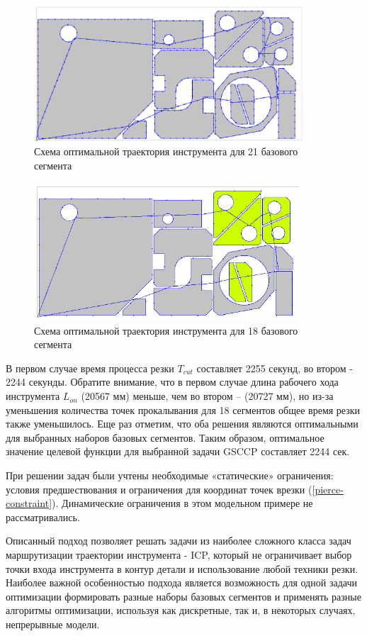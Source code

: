 \documentclass{article}
\begin{document}
\begin{figure}
  \begin{center}
  \includegraphics[width=0.9\textwidth]{path21.png}
  \caption{Схема оптимальной траектория инструмента для 21 базового сегмента}
  \label{path21}
  \end{center}
\end{figure}

\begin{figure}
  \begin{center}
  \includegraphics[width=0.9\textwidth]{path18.png}
  \caption{Схема оптимальной траектория инструмента для 18 базового сегмента}
  \label{path18}
  \end{center}
\end{figure}

В первом случае время процесса резки
$T_{cut}$
составляет 2255 секунд,
во втором - 2244 секунды.
Обратите внимание, что в первом случае длина рабочего хода инструмента
$L_{on}$
(20567 мм) меньше, чем во втором – (20727 мм),
но из-за уменьшения количества точек прокалывания
для 18 сегментов общее время резки также уменьшилось.
Еще раз отметим, что оба решения являются оптимальными
для выбранных наборов базовых сегментов.
Таким образом, оптимальное значение целевой
функции для выбранной задачи GSCCP составляет 2244 сек.

При решении задач были учтены необходимые «статические» ограничения:
условия предшествования и ограничения для координат
точек врезки (\ref{pierce-constraint}).
Динамические ограничения в этом модельном примере не рассматривались.

Описанный подход позволяет решать задачи из
наиболее сложного класса задач маршрутизации
траектории инструмента - ICP,
который не ограничивает выбор точки входа
инструмента в контур детали и использование
любой техники резки.
Наиболее важной особенностью подхода
является возможность для одной задачи оптимизации
формировать разные наборы базовых сегментов и
применять разные алгоритмы оптимизации,
используя как дискретные, так и,
в некоторых случаях, непрерывные модели.
\end{document}
